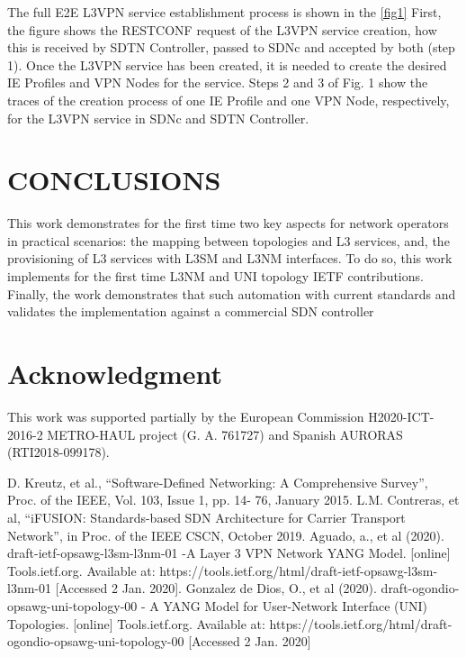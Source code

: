 \documentclass[conference]{IEEEtran}
\begin{document}
The full E2E L3VPN service establishment process is shown in the \ref{fig1} First, the figure shows the RESTCONF request of the L3VPN service creation, how this is received by SDTN Controller, passed to SDNc and accepted by both (step 1). Once the L3VPN service has been created, it is needed to create the desired IE Profiles and VPN Nodes for the service. Steps 2 and 3 of Fig. 1 show the traces of the creation process of one IE Profile and one VPN Node, respectively, for the L3VPN service in SDNc and SDTN Controller.

\section{CONCLUSIONS}

This work demonstrates for the first time two key aspects for network operators in practical scenarios: the mapping between topologies and L3 services, and,  the provisioning of L3 services with L3SM and L3NM interfaces. To do so, this work  implements for the first time L3NM and UNI topology IETF contributions. Finally, the work demonstrates that such automation with current standards and validates the implementation against a commercial SDN controller

\section*{Acknowledgment}
This work was supported partially by the European Commission H2020-ICT-2016-2 METRO-HAUL project (G. A. 761727) and Spanish AURORAS (RTI2018-099178).

\begin{thebibliography}{00}
 D. Kreutz, et al., “Software-Defined Networking: A Comprehensive Survey”, Proc. of the IEEE, Vol. 103, Issue 1, pp. 14- 76, January 2015.
 L.M. Contreras, et al, “iFUSION: Standards-based SDN Architecture for Carrier Transport Network”, in Proc. of the IEEE CSCN, October 2019.
 Aguado, a., et al (2020). draft-ietf-opsawg-l3sm-l3nm-01 -A Layer 3 VPN Network YANG Model. [online] Tools.ietf.org. Available at: https://tools.ietf.org/html/draft-ietf-opsawg-l3sm-l3nm-01 [Accessed 2 Jan. 2020].
 Gonzalez de Dios, O., et al (2020). draft-ogondio-opsawg-uni-topology-00 - A YANG Model for User-Network Interface (UNI) Topologies. [online] Tools.ietf.org. Available at: https://tools.ietf.org/html/draft-ogondio-opsawg-uni-topology-00 [Accessed 2 Jan. 2020]
\end{thebibliography}
\end{document}
